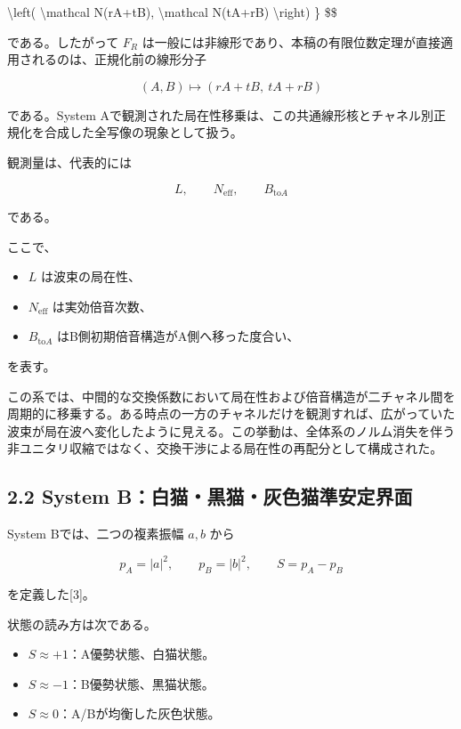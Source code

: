 \documentclass[
  a4paper,
  10pt]{article}
\providecommand{\tightlist}{%
  \setlength{\itemsep}{0pt}\setlength{\parskip}{0pt}}
\begin{document}
\textbackslash left( \textbackslash mathcal N(rA+tB),
\textbackslash mathcal N(tA+rB) \textbackslash right) \} \$\$

である。したがって \(F_R\)
は一般には非線形であり、本稿の有限位数定理が直接適用されるのは、正規化前の線形分子

\[
(A,B)\longmapsto(rA+tB,\ tA+rB)
\]

である。System
Aで観測された局在性移乗は、この共通線形核とチャネル別正規化を合成した全写像の現象として扱う。

観測量は、代表的には

\[
L,
\qquad
N_{\mathrm{eff}},
\qquad
B_{\mathrm{to}A}
\]

である。

ここで、

\begin{itemize}
\tightlist
\item
  \(L\) は波束の局在性、
\item
  \(N_{\mathrm{eff}}\) は実効倍音次数、
\item
  \(B_{\mathrm{to}A}\) はB側初期倍音構造がA側へ移った度合い、
\end{itemize}

を表す。

この系では、中間的な交換係数において局在性および倍音構造が二チャネル間を周期的に移乗する。ある時点の一方のチャネルだけを観測すれば、広がっていた波束が局在波へ変化したように見える。この挙動は、全体系のノルム消失を伴う非ユニタリ収縮ではなく、交換干渉による局在性の再配分として構成された。

\subsection{2.2 System
B：白猫・黒猫・灰色猫準安定界面}\label{22-system-bux767dux732bux9ed2ux732bux7070ux8272ux732bux6e96ux5b89ux5b9aux754cux9762}

System Bでは、二つの複素振幅 \(a,b\) から

\[
p_A=|a|^2,
\qquad
p_B=|b|^2,
\qquad
S=p_A-p_B
\]

を定義した{[}3{]}。

状態の読み方は次である。

\begin{itemize}
\tightlist
\item
  \(S\approx+1\)：A優勢状態、白猫状態。
\item
  \(S\approx-1\)：B優勢状態、黒猫状態。
\item
  \(S\approx0\)：A/Bが均衡した灰色状態。
\end{itemize}
\end{document}
